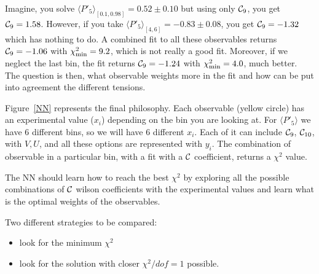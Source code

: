 \documentclass[11pt,amsmath,amssymb]{article}
\newcommand{\Cc}[1]{{\cal C}_{#1}}
\begin{document}
Imagine, you solve   $\langle P'_5 \rangle_{[0.1,0.98]}  = 0.52 \pm 0.10$ but using only $\Cc{9}$, you get $\Cc{9} = 1.58$. However, if you take
$\langle P'_5 \rangle_{[4,6]}  = -0.83 \pm 0.08$, you get $\Cc{9} = -1.32$ which has nothing to do.
A combined fit to all these observables returns $\Cc{9} = -1.06$ with $\chi^2_{\rm min} = 9.2$, which is not really a good fit. Moreover, if we neglect
the last bin, the fit returns $\Cc{9} = -1.24$ with $\chi^2_{\rm min} = 4.0$, much better. The question is then, what observable weights more in the fit
and how can be put into agreement the different tensions.

\begin{figure}[htbp]
\begin{center}
\end{center}
\end{figure}


Figure~\ref{NN} represents the final philosophy. Each observable (yellow circle) has an experimental value ($x_i$) 
depending on the bin you are looking at. For $\langle P'_5 \rangle$ we have 6 different bins, so we will have 6 different $x_i$.
Each of it can include $\Cc{9}$, $\Cc{10}$, with $V,U$, and all these options are represented with $y_i$. The combination of
observable in a particular bin, with a fit with a ${\cal C}$ coefficient, returns a $\chi^2$ value.

The NN should learn how to reach the best $\chi^2$ by exploring all the possible combinations of ${\cal C}$ wilson coefficients
with the experimental values and learn what is the optimal weights of the observables.

Two different strategies to be compared:
\begin{itemize}
\item look for the minimum $\chi^2$
\item look for the solution with closer $\chi^2/dof = 1$ possible.
\end{itemize}
\end{document}
